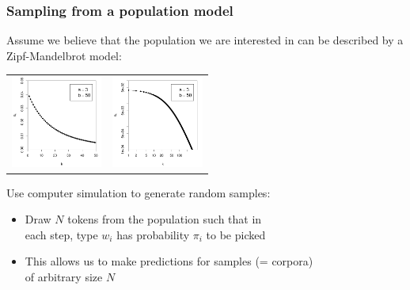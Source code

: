 \documentclass[handout,notes=show,t]{beamer} %
\begin{document}
\begin{frame}
  \frametitle{Sampling from a population model}

  Assume we believe that the population we are interested in can be described
  by a Zipf-Mandelbrot model: 
  \begin{center}
    \begin{tabular}{cc}
      \includegraphics[width=30mm]{img/05-samples-zm-model} &
      \includegraphics[width=30mm]{img/05-samples-zm-model-log} 
    \end{tabular}
  \end{center}
  
  Use computer simulation to generate random samples:
  \begin{itemize}
  \item Draw $N$ tokens from the population such that in\\
    each step, type $w_i$ has probability $\pi_i$ to be picked
  \item This allows us to make predictions for samples (= corpora)\\
    of arbitrary size $N$
  \end{itemize}
\end{frame}
\end{document}
